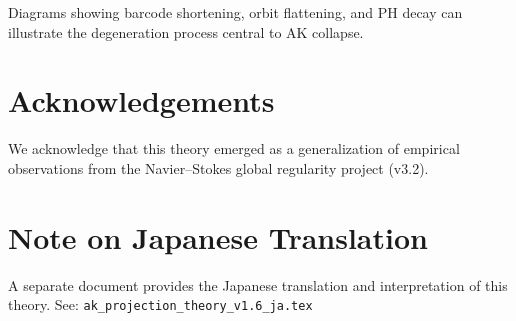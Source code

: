 \documentclass[11pt]{article}
\begin{document}
Diagrams showing barcode shortening, orbit flattening, and PH decay can illustrate the degeneration process central to AK collapse.

\section*{Acknowledgements}
We acknowledge that this theory emerged as a generalization of empirical observations from the Navier--Stokes global regularity project (v3.2).

\section*{Note on Japanese Translation}
A separate document provides the Japanese translation and interpretation of this theory. See: \texttt{ak\_projection\_theory\_v1.6\_ja.tex}
\end{document}

